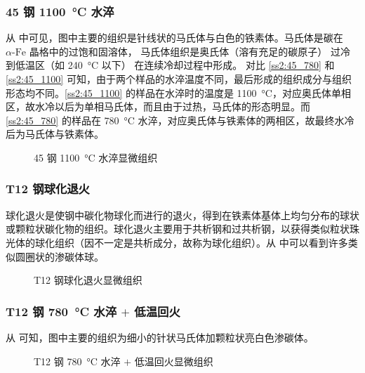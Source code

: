 \documentclass[a4paper,utf8]{article}
\begin{document}
        \subsubsection{45 钢 \SI{1100}{\degreeCelsius} 水淬\label{ss2:45_1100}}
            从 中可见，图中主要的组织是针线状的马氏体与白色的铁素体。马氏体是碳在$\alpha\text{-Fe}$ 晶格中的过饱和固溶体， 马氏体组织是奥氏体（溶有充足的碳原子） 过冷到低温区（如 \SI{240}{\degreeCelsius} 以下） 在连续冷却过程中形成。
            对比 \ref{ss2:45_780} 和 \ref{ss2:45_1100} 可知，由于两个样品的水淬温度不同，最后形成的组织成分与组织形态均不同。\ref{ss2:45_1100} 的样品在水淬时的温度是 \SI{1100}{\degreeCelsius}，对应奥氏体单相区，故水冷以后为单相马氏体，而且由于过热，马氏体的形态明显。而 \ref{ss2:45_780} 的样品在 \SI{780}{\degreeCelsius} 水淬，对应奥氏体与铁素体的两相区，故最终水冷后为马氏体与铁素体。

            \begin{figure}[!ht]
                \hspace{20pt}
                \caption{45 钢 \SI{1100}{\degreeCelsius} 水淬显微组织\label{fig:n11}}
            \end{figure}

        \subsubsection{T12 钢球化退火}
            球化退火是使钢中碳化物球化而进行的退火，得到在铁素体基体上均匀分布的球状或颗粒状碳化物的组织。球化退火主要用于共析钢和过共析钢，以获得类似粒状珠光体的球化组织（因不一定是共析成分，故称为球化组织）。从 中可以看到许多类似圆圈状的渗碳体球。
            \begin{figure}[!ht]
                \hspace{20pt}
                \caption{T12 钢球化退火显微组织\label{fig:n12}}
            \end{figure}

        \subsubsection{T12 钢 \SI{780}{\degreeCelsius} 水淬 $+$ 低温回火\label{ss2:t12_780}}
            从 可知，图中主要的组织为细小的针状马氏体加颗粒状亮白色渗碳体。
            \begin{figure}[!ht]
                \hspace{20pt}
                \caption{T12 钢 \SI{780}{\degreeCelsius} 水淬 $+$ 低温回火显微组织\label{fig:n13}}
            \end{figure}
\end{document}
